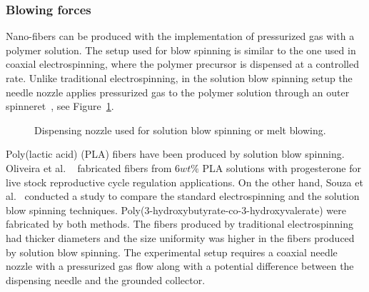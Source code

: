 \subsubsection{Blowing forces}Nano-fibers can be produced with the implementation of pressurized gas with a polymer solution. The setup used for blow spinning is similar to the one used in coaxial electrospinning, where the polymer precursor is dispensed at a controlled rate. Unlike traditional electrospinning, in the solution blow spinning setup the needle nozzle applies pressurized gas to the polymer solution through an outer spinneret\unskip~\cite{527120:13538056}, see Figure~\ref{f-92361290d8c3}. 


\bgroup
\begin{figure}[!htbp]
\centering \makeatletter{}
\makeatother 
\caption{{Dispensing nozzle used for solution blow spinning or melt blowing. \unskip~\protect\cite{527120:13538056}}}
\label{f-92361290d8c3}
\end{figure}
\egroup
Poly(lactic acid) (PLA) fibers have been produced by solution blow spinning. Oliveira et al. \unskip~\cite{527120:13539278} fabricated fibers from $6 wt\% $ PLA solutions with progesterone for live stock reproductive cycle regulation applications. On the other hand, Souza et al.\unskip~\cite{527120:13538056} conducted a study to compare the standard electrospinning and the solution blow spinning techniques. Poly(3-hydroxybutyrate-co-3-hydroxyvalerate) were fabricated by both methods. The fibers produced by traditional electrospinning had thicker diameters and the size uniformity was higher in the fibers produced by solution blow spinning. The experimental setup requires a coaxial needle nozzle with a pressurized gas flow along with a potential difference between the dispensing needle and the grounded collector.



